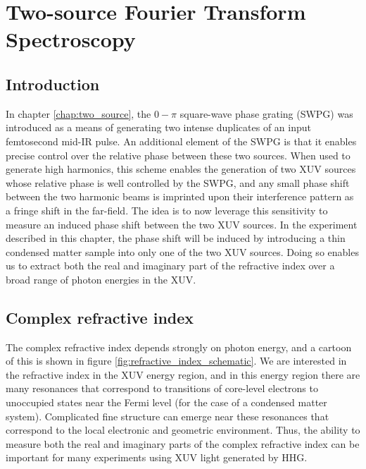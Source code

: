 \chapter{Two-source Fourier Transform Spectroscopy}
\label{chap:refractive_index}

\section{Introduction}
\label{intro_ts}
In chapter \ref{chap:two_source}, the $0-\pi$ square-wave phase grating (SWPG) was introduced as a means of generating two intense duplicates of an input femtosecond mid-IR pulse.  An additional element of the SWPG is that it enables precise control over the relative phase between these two sources.  When used to generate high harmonics, this scheme enables the generation of two XUV sources whose relative phase is well controlled by the SWPG, and any small phase shift between the two harmonic beams is imprinted upon their interference pattern as a fringe shift in the far-field.  The idea is to now leverage this sensitivity to measure an induced phase shift between the two XUV sources.  In the experiment described in this chapter, the phase shift will be induced by introducing a thin condensed matter sample into only one of the two XUV sources.  Doing so enables us to extract both the real and imaginary part of the refractive index over a broad range of photon energies in the XUV.
\section{Complex refractive index}
The complex refractive index depends strongly on photon energy, and a cartoon of this is shown in figure \ref{fig:refractive_index_schematic}. We are interested in the refractive index in the XUV energy region, and in this energy region there are many resonances that correspond to transitions of core-level electrons to unoccupied states near the Fermi level (for the case of a condensed matter system)\cite{stohrNEXAFSSpectroscopy1992, attwoodSoftXraysExtreme2000}.  Complicated fine structure can emerge near these resonances that correspond to the local electronic and geometric environment\cite{stohrNEXAFSSpectroscopy1992, attwoodSoftXraysExtreme2000}.  Thus, the ability to measure both the real and imaginary parts of the complex refractive index can be important for many experiments using XUV light generated by HHG\cite{kaplanFemtosecondTrackingCarrier2018,  cirriAchievingSurfaceSensitivity2017}.

